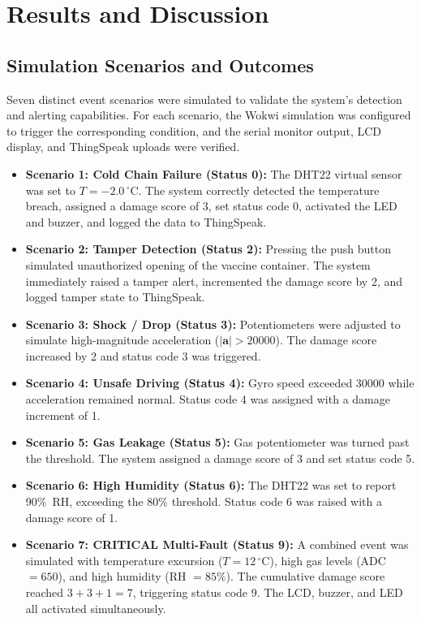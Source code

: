 \documentclass[12pt, a4paper]{article}
\begin{document}
\section{Results and Discussion}
\label{sec:results}

\subsection{Simulation Scenarios and Outcomes}

Seven distinct event scenarios were simulated to validate the system's detection and alerting capabilities. For each scenario, the Wokwi simulation was configured to trigger the corresponding condition, and the serial monitor output, LCD display, and ThingSpeak uploads were verified.

\begin{itemize}[leftmargin=*]
  \item \textbf{Scenario 1: Cold Chain Failure (Status 0):} The DHT22 virtual sensor was set to $T = -2.0\,^\circ$C. The system correctly detected the temperature breach, assigned a damage score of 3, set status code 0, activated the LED and buzzer, and logged the data to ThingSpeak.
  \item \textbf{Scenario 2: Tamper Detection (Status 2):} Pressing the push button simulated unauthorized opening of the vaccine container. The system immediately raised a tamper alert, incremented the damage score by 2, and logged tamper state to ThingSpeak.
  \item \textbf{Scenario 3: Shock / Drop (Status 3):} Potentiometers were adjusted to simulate high-magnitude acceleration ($|\mathbf{a}| > 20000$). The damage score increased by 2 and status code 3 was triggered.
  \item \textbf{Scenario 4: Unsafe Driving (Status 4):} Gyro speed exceeded 30000 while acceleration remained normal. Status code 4 was assigned with a damage increment of 1.
  \item \textbf{Scenario 5: Gas Leakage (Status 5):} Gas potentiometer was turned past the threshold. The system assigned a damage score of 3 and set status code 5.
  \item \textbf{Scenario 6: High Humidity (Status 6):} The DHT22 was set to report 90\%~RH, exceeding the 80\% threshold. Status code 6 was raised with a damage score of 1.
  \item \textbf{Scenario 7: CRITICAL Multi-Fault (Status 9):} A combined event was simulated with temperature excursion ($T = 12\,^\circ$C), high gas levels (ADC $= 650$), and high humidity (RH $= 85\%$). The cumulative damage score reached $3 + 3 + 1 = 7$, triggering status code 9. The LCD, buzzer, and LED all activated simultaneously.
\end{itemize}
\end{document}
